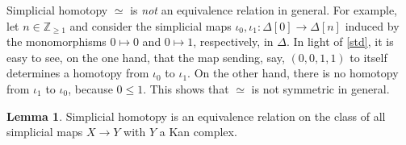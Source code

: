 \documentclass[10pt,letterpaper,cm]{nupset}
\theoremstyle{definition}
\theoremstyle{theorem}
\newtheorem{lemma}[definition]{Lemma}
\theoremstyle{remark}
\newcommand{\Z}{\mathbb Z}
\newcommand{\0}{\mathbf{0}}
\newcommand{\1}{\mathbf{1}}
\newcommand{\2}{\mathbf{2}}
\begin{document}
\medskip

Simplicial homotopy ${}\simeq{}$ is \emph{not} an equivalence relation in general. For example, let $n\in \Z_{\geq 1}$ and consider the simplicial maps $\iota_0, \iota_1 : \Delta[0] \to \Delta[n]$ induced by the monomorphisms $0 \mapsto 0$ and $0 \mapsto 1$, respectively, in $\varDelta$. In light of \cref{std}, it is easy to see, on the one hand, that the map sending, say, $\left(0, 0, 1, 1\right)$ to itself determines a homotopy from $\iota_0$ to $\iota_1$. On the other hand, there is no homotopy from $\iota_1$ to $\iota_0$, because $0\leq 1$. This shows that ${}\simeq{}$ is not symmetric in general. 

\begin{lemma}
Simplicial homotopy is an equivalence relation on the class of all simplicial maps $X\to Y$ with $Y$ a Kan complex.
\end{lemma}
\end{document}
